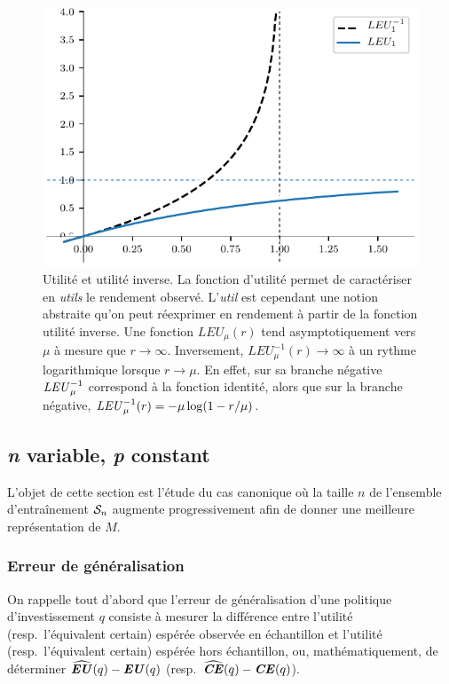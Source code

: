 \begin{figure}[ht]
  \includegraphics[width=\textwidth]{../experiments/fig/leu_inv.pdf}
  \caption[Fonction LEU et LEU inverse]{Utilité et utilité inverse. La fonction d'utilité
    permet de caractériser en \textit{utils} le rendement observé. L'\textit{util} est
    cependant une notion abstraite qu'on peut réexprimer en rendement à partir de la
    fonction utilité inverse. Une fonction $LEU_\mu(r)$ tend asymptotiquement vers $\mu$ à
    mesure que $r\to \infty$. Inversement, $LEU_\mu^{-1}(r)\to\infty$ à un rythme logarithmique lorsque
    $r\to\mu$. En effet, sur sa branche négative $\LEU_\mu^{-1}$ correspond à la fonction
    identité, alors que sur la branche négative, $\LEU_\mu^{-1}(r) = -\mu\log(1-r/\mu)$.}
  \label{fig_leu_inv}
\end{figure}

\clearpage


\subsection{\textit{n} variable, \textit{p} constant}
\label{emp:nvar}

L'objet de cette section est l'étude du cas canonique où la taille $n$ de l'ensemble
d'entraînement $\S_n$ augmente progressivement afin de donner une meilleure représentation
de $M$.


\subsubsection{Erreur de généralisation}

On rappelle tout d'abord que l'erreur de généralisation d'une politique d'investissement
$q$ consiste à mesurer la différence entre l'utilité (resp.~l'équivalent certain) espérée
observée en échantillon et l'utilité (resp.~l'équivalent certain) espérée hors
échantillon, ou, mathématiquement, de déterminer $\hEU(q) - \EU(q)$
(resp.~$\hCE(q) - \CE(q)$).

